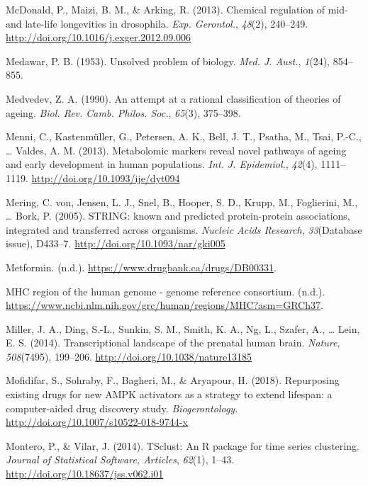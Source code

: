 \documentclass[12pt,twoside]{unicam}
\begin{document}
\begin{cslreferences}
\leavevmode\hypertarget{ref-McDonald2013}{}%
McDonald, P., Maizi, B. M., \& Arking, R. (2013). Chemical regulation of mid- and late-life longevities in drosophila. \emph{Exp. Gerontol.}, \emph{48}(2), 240--249. \url{http://doi.org/10.1016/j.exger.2012.09.006}

\leavevmode\hypertarget{ref-Medawar1953}{}%
Medawar, P. B. (1953). Unsolved problem of biology. \emph{Med. J. Aust.}, \emph{1}(24), 854--855.

\leavevmode\hypertarget{ref-Medvedev1990}{}%
Medvedev, Z. A. (1990). An attempt at a rational classification of theories of ageing. \emph{Biol. Rev. Camb. Philos. Soc.}, \emph{65}(3), 375--398.

\leavevmode\hypertarget{ref-Menni2013}{}%
Menni, C., Kastenmüller, G., Petersen, A. K., Bell, J. T., Psatha, M., Tsai, P.-C., \ldots{} Valdes, A. M. (2013). Metabolomic markers reveal novel pathways of ageing and early development in human populations. \emph{Int. J. Epidemiol.}, \emph{42}(4), 1111--1119. \url{http://doi.org/10.1093/ije/dyt094}

\leavevmode\hypertarget{ref-VonMering2005}{}%
Mering, C. von, Jensen, L. J., Snel, B., Hooper, S. D., Krupp, M., Foglierini, M., \ldots{} Bork, P. (2005). STRING: known and predicted protein-protein associations, integrated and transferred across organisms. \emph{Nucleic Acids Research}, \emph{33}(Database issue), D433--7. \url{http://doi.org/10.1093/nar/gki005}

\leavevmode\hypertarget{ref-Metformin}{}%
Metformin. (n.d.). \url{https://www.drugbank.ca/drugs/DB00331}.

\leavevmode\hypertarget{ref-mhc2020}{}%
MHC region of the human genome - genome reference consortium. (n.d.). \url{https://www.ncbi.nlm.nih.gov/grc/human/regions/MHC?asm=GRCh37}.

\leavevmode\hypertarget{ref-Miller2014}{}%
Miller, J. A., Ding, S.-L., Sunkin, S. M., Smith, K. A., Ng, L., Szafer, A., \ldots{} Lein, E. S. (2014). Transcriptional landscape of the prenatal human brain. \emph{Nature}, \emph{508}(7495), 199--206. \url{http://doi.org/10.1038/nature13185}

\leavevmode\hypertarget{ref-Mofidifar2018}{}%
Mofidifar, S., Sohraby, F., Bagheri, M., \& Aryapour, H. (2018). Repurposing existing drugs for new AMPK activators as a strategy to extend lifespan: a computer-aided drug discovery study. \emph{Biogerontology}. \url{http://doi.org/10.1007/s10522-018-9744-x}

\leavevmode\hypertarget{ref-Montero2014}{}%
Montero, P., \& Vilar, J. (2014). TSclust: An R package for time series clustering. \emph{Journal of Statistical Software, Articles}, \emph{62}(1), 1--43. \url{http://doi.org/10.18637/jss.v062.i01}


\end{cslreferences}
\end{document}
